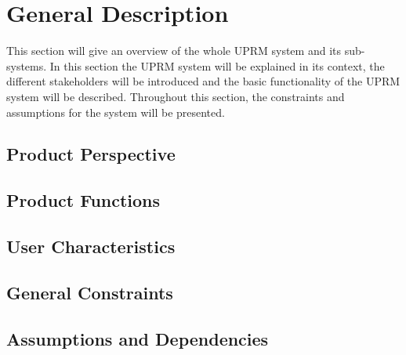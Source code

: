 
\section{General Description}
This section will give an overview of the whole UPRM system and its sub-systems.
In this section the UPRM system will be explained in its context, the different stakeholders will be introduced and the basic functionality of the UPRM system will be described. Throughout this section, the constraints and assumptions for the system will be presented.

	\subsection{Product Perspective}
	\subsection{Product Functions}
	\subsection{User Characteristics}
	\subsection{General Constraints}
	\subsection{Assumptions and Dependencies}
